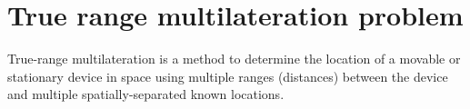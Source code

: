 \documentclass[./main.tex]{subfiles}
\begin{document}
\chapter{True range multilateration problem}

True-range multilateration is a method to determine the location of a movable or stationary device in space using multiple ranges (distances) between the device and multiple spatially-separated known locations.
\end{document}
